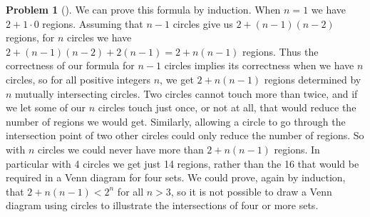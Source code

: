 \documentclass[10pt,]{book}
\theoremstyle{plain}
\theoremstyle{definition}
\newtheorem{activity}[project]{Problem}
\theoremstyle{definition}
\numberwithin{equation}{chapter}
\newcommand{\lt}{<}
\begin{document}
\begin{activity}[]
We can prove this formula by induction. When \(n=1\) we have \(2+1\cdot0\) regions. Assuming that \(n-1\) circles give us \(2+(n-1)(n-2)\) regions, for \(n\) circles we have \(2+(n-1)(n-2) +2(n-1)=2+n(n-1)\) regions. Thus the correctness of our formula for \(n-1\) circles implies its correctness when we have \(n\) circles, so for all positive integers \(n\), we get \(2+n(n-1)\) regions determined by \(n\) mutually intersecting circles. Two circles cannot touch more than twice, and if we let some of our \(n\) circles touch just once, or not at all, that would reduce the number of regions we would get. Similarly, allowing a circle to go through the intersection point of two other circles could only reduce the number of regions. So with \(n\) circles we could never have more than \(2+n(n-1)\) regions. In particular with 4 circles we get just 14 regions, rather than the 16 that would be required in a Venn diagram for four sets. We could prove, again by induction, that \(2+n(n-1)\lt 2^n\) for all \(n>3\), so it is not possible to draw a Venn diagram using circles to illustrate the intersections of four or more sets.%
\end{activity}
\typeout{************************************************}
\typeout{************************************************}
\end{document}
